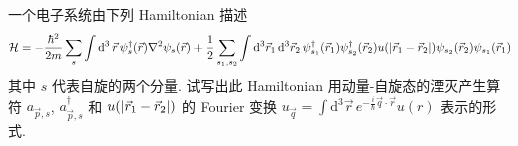 \documentclass{assignment}
\begin{document}
\begin{prob}
    一个电子系统由下列 Hamiltonian 描述
    \begin{align}
        \label{2-Kinetic-Energy}
        \mathcal{H}=-\frac{\hbar^2}{2m}\sum_s\int\mathrm{d}^3\,\vec{r}\,\psi_s^{\dagger}(\vec{r})\nabla^2\psi_s(\vec{r})+\frac{1}{2}\sum_{s_1,s_2}\int\mathrm{d}^3\vec{r}_1\,\mathrm{d}^3\vec{r}_2\,\psi_{s_1}^{\dagger}(\vec{r}_1)\psi_{s_2}^{\dagger}(\vec{r}_2)u(\left\lvert\vec{r}_1-\vec{r}_2\right\rvert)\psi_{s_2}(\vec{r}_2)\psi_{s_1}(\vec{r}_1)
    \end{align}
    其中 $s$ 代表自旋的两个分量. 试写出此 Hamiltonian 用动量-自旋态的湮灭产生算符 $a_{\vec{p},s}$, $a_{\vec{p},s}^{\dagger}$ 和 $u(\left\lvert\vec{r}_1-\vec{r}_2\right\rvert)$ 的 Fourier 变换 $u_{\vec{q}}=\int\mathrm{d}^3\vec{r}\,e^{-\frac{i}{\hbar}\vec{q}\cdot\vec{r}}u(r)$ 表示的形式.
\end{prob}
\end{document}
